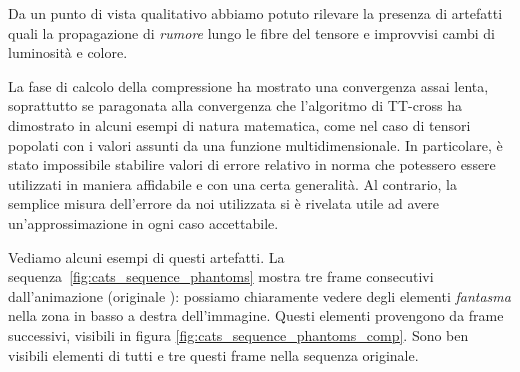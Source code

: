 \documentclass[11pt,a4paper]{article}
\begin{document}
Da un punto di vista qualitativo abbiamo potuto rilevare la presenza di artefatti quali la propagazione di \emph{rumore} lungo le fibre del tensore e improvvisi cambi di luminosità e colore.

La fase di calcolo della compressione ha mostrato una convergenza assai lenta, soprattutto se paragonata alla convergenza che l'algoritmo di TT-cross ha dimostrato in alcuni esempi di natura matematica, come nel caso di tensori popolati con i valori assunti da una funzione multidimensionale. In particolare, è stato impossibile stabilire valori di errore relativo in norma che potessero essere utilizzati in maniera affidabile e con una certa generalità. Al contrario, la semplice misura dell'errore da noi utilizzata si è rivelata utile ad avere un'approssimazione in ogni caso accettabile.

Vediamo alcuni esempi di questi artefatti. La sequenza~\ref{fig:cats_sequence_phantoms} mostra tre frame consecutivi dall'animazione \href{http://poisson.phc.unipi.it/~bianucci/shared/tesi/cats_TT.gif}{} (originale \href{http://poisson.phc.unipi.it/~bianucci/shared/tesi/cats.gif}{}): possiamo chiaramente vedere degli elementi \emph{fantasma} nella zona in basso a destra dell'immagine. Questi elementi provengono da frame successivi, visibili in figura \ref{fig:cats_sequence_phantoms_comp}. Sono ben visibili elementi di tutti e tre questi frame nella sequenza originale.
\end{document}
